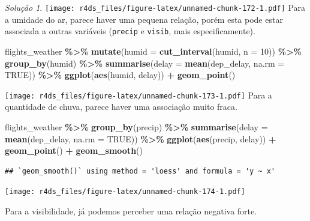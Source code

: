 \documentclass[
]{latex/krantz}
\newenvironment{Shaded}{\begin{snugshade}}{\end{snugshade}}
\newcommand{\AttributeTok}[1]{\textcolor[rgb]{0.13,0.29,0.53}{#1}}
\newcommand{\ConstantTok}[1]{\textcolor[rgb]{0.56,0.35,0.01}{#1}}
\newcommand{\DecValTok}[1]{\textcolor[rgb]{0.00,0.00,0.81}{#1}}
\newcommand{\FunctionTok}[1]{\textcolor[rgb]{0.13,0.29,0.53}{\textbf{#1}}}
\newcommand{\NormalTok}[1]{#1}
\newcommand{\SpecialCharTok}[1]{\textcolor[rgb]{0.81,0.36,0.00}{\textbf{#1}}}
\theoremstyle{definition}
\theoremstyle{definition}
\theoremstyle{definition}
\theoremstyle{definition}
\theoremstyle{remark}
\newtheorem*{solution}{Solução}
\begin{document}
\begin{solution}
\texttt{[image: r4ds\_files/figure-latex/unnamed-chunk-172-1.pdf]}
Para a umidade do ar, parece haver uma pequena relação, porém esta pode estar associada a outras variáveis (\texttt{precip} e \texttt{visib}, mais especificamente).

\begin{Shaded}
\begin{Highlighting}[]
\NormalTok{flights\_weather }\SpecialCharTok{\%\textgreater{}\%}
  \FunctionTok{mutate}\NormalTok{(}\AttributeTok{humid =} \FunctionTok{cut\_interval}\NormalTok{(humid, }\AttributeTok{n =} \DecValTok{10}\NormalTok{)) }\SpecialCharTok{\%\textgreater{}\%}
  \FunctionTok{group\_by}\NormalTok{(humid) }\SpecialCharTok{\%\textgreater{}\%}
  \FunctionTok{summarise}\NormalTok{(}\AttributeTok{delay =} \FunctionTok{mean}\NormalTok{(dep\_delay, }\AttributeTok{na.rm =} \ConstantTok{TRUE}\NormalTok{)) }\SpecialCharTok{\%\textgreater{}\%}
  \FunctionTok{ggplot}\NormalTok{(}\FunctionTok{aes}\NormalTok{(humid, delay)) }\SpecialCharTok{+}
    \FunctionTok{geom\_point}\NormalTok{()}
\end{Highlighting}
\end{Shaded}

\texttt{[image: r4ds\_files/figure-latex/unnamed-chunk-173-1.pdf]}
Para a quantidade de chuva, parece haver uma associação muito fraca.

\begin{Shaded}
\begin{Highlighting}[]
\NormalTok{flights\_weather }\SpecialCharTok{\%\textgreater{}\%}
  \FunctionTok{group\_by}\NormalTok{(precip) }\SpecialCharTok{\%\textgreater{}\%}
  \FunctionTok{summarise}\NormalTok{(}\AttributeTok{delay =} \FunctionTok{mean}\NormalTok{(dep\_delay, }\AttributeTok{na.rm =} \ConstantTok{TRUE}\NormalTok{)) }\SpecialCharTok{\%\textgreater{}\%}
  \FunctionTok{ggplot}\NormalTok{(}\FunctionTok{aes}\NormalTok{(precip, delay)) }\SpecialCharTok{+}
    \FunctionTok{geom\_point}\NormalTok{() }\SpecialCharTok{+}
    \FunctionTok{geom\_smooth}\NormalTok{()}
\end{Highlighting}
\end{Shaded}

\begin{verbatim}
## `geom_smooth()` using method = 'loess' and formula = 'y ~ x'
\end{verbatim}

\texttt{[image: r4ds\_files/figure-latex/unnamed-chunk-174-1.pdf]}

Para a visibilidade, já podemos perceber uma relação negativa forte.


\end{solution}
\end{document}
